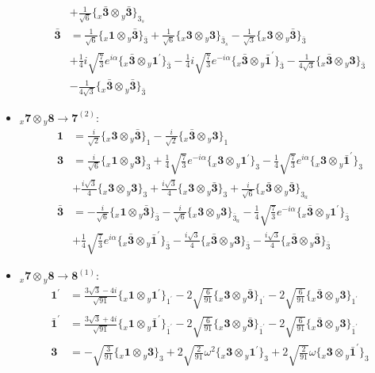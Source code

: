 \documentclass[english]{article}
\newcommand{\rep}[1]{\mathbf{#1}}
\newcommand{\repx}[2]{{}_{#2}\mathbf{#1}}
\newcommand{\tsprodx}[2]{\repx{#1}{x}\otimes\repx{#2}{y}}
\newcommand{\subcgt}[3]{\big\{ \tsprodx{#1}{#2}\big\}^{}_{#3}}
\begin{document}
\begin{itemize}
\begin{align*}
 & +\frac{1}{\sqrt{6}}\subcgt{\bar{3}}{\bar{3}}{3_{s}}
\\
\rep{\bar{3}} & = \frac{1}{\sqrt{6}}\subcgt{1}{\bar{3}}{\bar{3}}+\frac{1}{\sqrt{6}}\subcgt{3}{3}{\bar{3}_{s}}-\frac{1}{\sqrt{3}}\subcgt{3}{\bar{3}}{\bar{3}} \\ 
 & +\frac{1}{4} i \sqrt{\frac{7}{3}} e^{i \alpha }\subcgt{\bar{3}}{1^{\prime}}{\bar{3}}-\frac{1}{4} i \sqrt{\frac{7}{3}} e^{-i \alpha }\subcgt{\bar{3}}{\bar{1}^{\prime}}{\bar{3}}-\frac{1}{4 \sqrt{3}}\subcgt{\bar{3}}{3}{\bar{3}} \\ 
 & -\frac{1}{4 \sqrt{3}}\subcgt{\bar{3}}{\bar{3}}{\bar{3}}
\end{align*}
\item $\tsprodx{7}{8}\to\rep{7}^{(2)}$:
\begin{align*}
\rep{1} & = \frac{i}{\sqrt{2}}\subcgt{3}{\bar{3}}{1}-\frac{i}{\sqrt{2}}\subcgt{\bar{3}}{3}{1}
\\
\rep{3} & = \frac{i}{\sqrt{6}}\subcgt{1}{3}{3}+\frac{1}{4} \sqrt{\frac{7}{3}} e^{-i \alpha }\subcgt{3}{1^{\prime}}{3}-\frac{1}{4} \sqrt{\frac{7}{3}} e^{i \alpha }\subcgt{3}{\bar{1}^{\prime}}{3} \\ 
 & +\frac{i \sqrt{3}}{4}\subcgt{3}{3}{3}+\frac{i \sqrt{3}}{4}\subcgt{3}{\bar{3}}{3}+\frac{i}{\sqrt{6}}\subcgt{\bar{3}}{\bar{3}}{3_{a}}
\\
\rep{\bar{3}} & = -\frac{i}{\sqrt{6}}\subcgt{1}{\bar{3}}{\bar{3}}-\frac{i}{\sqrt{6}}\subcgt{3}{3}{\bar{3}_{a}}-\frac{1}{4} \sqrt{\frac{7}{3}} e^{-i \alpha }\subcgt{\bar{3}}{1^{\prime}}{\bar{3}} \\ 
 & +\frac{1}{4} \sqrt{\frac{7}{3}} e^{i \alpha }\subcgt{\bar{3}}{\bar{1}^{\prime}}{\bar{3}}-\frac{i \sqrt{3}}{4}\subcgt{\bar{3}}{3}{\bar{3}}-\frac{i \sqrt{3}}{4}\subcgt{\bar{3}}{\bar{3}}{\bar{3}}
\end{align*}
\item $\tsprodx{7}{8}\to\rep{8}^{(1)}$:
\begin{align*}
\rep{1^{\prime}} & = \frac{3 \sqrt{3}-4 i}{\sqrt{91}}\subcgt{1}{1^{\prime}}{1^{\prime}}-2 \sqrt{\frac{6}{91}}\subcgt{3}{\bar{3}}{1^{\prime}}-2 \sqrt{\frac{6}{91}}\subcgt{\bar{3}}{3}{1^{\prime}}
\\
\rep{\bar{1}^{\prime}} & = \frac{3 \sqrt{3}+4 i}{\sqrt{91}}\subcgt{1}{\bar{1}^{\prime}}{\bar{1}^{\prime}}-2 \sqrt{\frac{6}{91}}\subcgt{3}{\bar{3}}{\bar{1}^{\prime}}-2 \sqrt{\frac{6}{91}}\subcgt{\bar{3}}{3}{\bar{1}^{\prime}}
\\
\rep{3} & = -\sqrt{\frac{3}{91}}\subcgt{1}{3}{3}+2 \sqrt{\frac{2}{91}} \omega ^2\subcgt{3}{1^{\prime}}{3}+2 \sqrt{\frac{2}{91}} \omega\subcgt{3}{\bar{1}^{\prime}}{3} \\ 

\end{align*}
\end{itemize}
\end{document}

